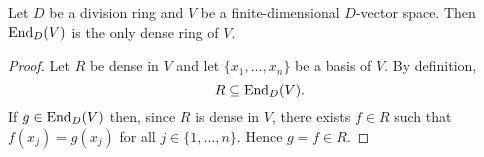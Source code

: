 %
%

\begin{proposition}
	\label{pro:unique_dense}
	Let $D$ be a division ring and 
    $V$ be a finite-dimensional $D$-vector space.  
	Then $\operatorname{End}_D(V)$ is the only dense ring of $V$.
\end{proposition}

\begin{proof}
	Let $R$ be dense in $V$ and let $\{x_1,\dots,x_n\}$ be a basis of $V$. By definition,
	\[
    R\subseteq\operatorname{End}_D(V).
    \]
    If $g\in\operatorname{End}_D(V)$ then, since $R$ is dense in $V$, there
	exists $f\in R$ such that $f(x_j)=g(x_j)$ for all 
	$j\in\{1,\dots,n\}$. Hence $g=f\in R$.
\end{proof}


